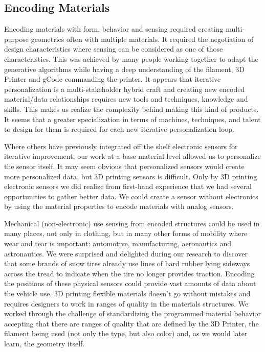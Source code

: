 \subsection{Encoding Materials}
Encoding materials with form, behavior and sensing required creating multi-purpose geometries often with multiple materials. It required the negotiation of design characteristics where sensing can be considered as one of those characteristics. This was achieved by many people working together to adapt the generative algorithms while having a deep understanding of the filament, 3D Printer and gCode commanding the printer. It appears that iterative personalization is a multi-stakeholder hybrid craft and creating new encoded material/data relationships requires new tools and techniques, knowledge and skills. This makes us realize the complexity behind making this kind of products. It seems that a greater specialization in terms of machines, techniques, and talent to design for them is required for each new iterative personalization loop.

Where others have previously integrated off the shelf electronic sensors for iterative improvement, our work at a base material level allowed us to personalize the sensor itself. It may seem obvious that personalized sensors would create more personalized data, but 3D printing sensors is difficult. Only by 3D printing electronic sensors we did realize from first-hand experience that we had several opportunities to gather better data. We could create a sensor without electronics by using the material properties to encode materials with analog sensors.

Mechanical (non-electronic) use sensing from encoded structures could be used in many places, not only in clothing, but in many other forms of mobility where wear and tear is important: automotive, manufacturing, aeronautics and astronautics. We were surprised and delighted during our research to discover that some brands of snow tires already use lines of hard rubber lying sideways across the tread to indicate when the tire no longer provides traction. Encoding the positions of these physical sensors could provide vast amounts of data about the vehicle use.
3D printing flexible materials doesn’t go without mistakes and requires designers to work in ranges of quality in the materials structures. We worked through the challenge of standardizing the programmed material behavior accepting that there are ranges of quality that are defined by the 3D Printer, the filament being used (not only the type, but also color) and, as we would later learn, the geometry itself. 

